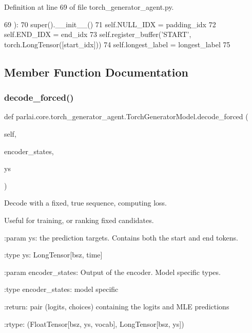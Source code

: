 Definition at line 69 of file torch\+\_\+generator\+\_\+agent.\+py.


\begin{DoxyCode}
69     ):
70         super().\_\_init\_\_()
71         self.NULL\_IDX = padding\_idx
72         self.END\_IDX = end\_idx
73         self.register\_buffer(\textcolor{stringliteral}{'START'}, torch.LongTensor([start\_idx]))
74         self.longest\_label = longest\_label
75 
\end{DoxyCode}


\subsection{Member Function Documentation}
\mbox{\label{classparlai_1_1core_1_1torch__generator__agent_1_1TorchGeneratorModel_abfc801c11be6fc49dfbc4e70dc6b8ed9}} 
\subsubsection{\texorpdfstring{decode\+\_\+forced()}{decode\_forced()}}
{\footnotesize\ttfamily def parlai.\+core.\+torch\+\_\+generator\+\_\+agent.\+Torch\+Generator\+Model.\+decode\+\_\+forced (\begin{DoxyParamCaption}\item[{}]{self,  }\item[{}]{encoder\+\_\+states,  }\item[{}]{ys }\end{DoxyParamCaption})}

\begin{DoxyVerb}Decode with a fixed, true sequence, computing loss.

Useful for training, or ranking fixed candidates.

:param ys:
    the prediction targets. Contains both the start and end tokens.

:type ys:
    LongTensor[bsz, time]

:param encoder_states:
    Output of the encoder. Model specific types.

:type encoder_states:
    model specific

:return:
    pair (logits, choices) containing the logits and MLE predictions

:rtype:
    (FloatTensor[bsz, ys, vocab], LongTensor[bsz, ys])
\end{DoxyVerb}
 

